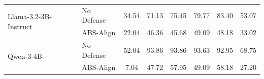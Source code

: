\begin{table}[htbp]
\begin{tabular}{ll ccccc c}
        \multirow{2}{*}{Llama-3.2-3B-Instruct}
         & No Defense           & 34.54 & 71.13 & 75.45 & 79.77 & 83.40 & 53.07 \\
         & ABS-Align            & 22.04 & 46.36 & 45.68 & 49.09 & 48.18 & 33.02 \\
        \midrule

        \multirow{2}{*}{Qwen-3-4B}
         & No Defense           & 52.04 & 93.86 & 93.86 & 93.63 & 92.95 & 68.75 \\
         & ABS-Align            &  7.04 & 47.72 & 57.95 & 49.09 & 58.18 & 27.20 \\

        
        \bottomrule
    \end{tabular}
    
\end{table}

